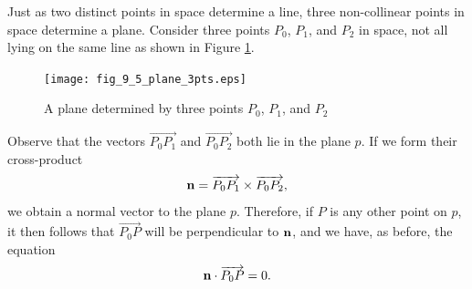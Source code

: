 Just as two distinct points in space determine a line, three
non-collinear points in space determine a plane.  
Consider three points $P_0$, $P_1$, and $P_2$ in space, not all lying
on the same line as shown in Figure \ref{F:9.5.Plane}.
\begin{figure}[ht]
\begin{center}
\texttt{[image: fig\_9\_5\_plane\_3pts.eps]}
\end{center}
\caption{A plane determined by three points $P_0$, $P_1$, and $P_2$}
\label{F:9.5.Plane}
\end{figure}

Observe that the vectors $\overrightarrow{P_0P_1}$ and
$\overrightarrow{P_0P_2}$ both lie in the plane $p$.  
If we form their cross-product
$$\mathbf{n} = \overrightarrow{P_0P_1} \times \overrightarrow{P_0P_2},$$
we obtain a normal vector to the plane $p$.  
Therefore, if $P$ is any other point on  $p$, it then follows that
$\overrightarrow{P_0P}$ will be perpendicular to $\mathbf{n}$, and we have,
as before, the equation
\begin{equation} \label{eq:9.5.plane_vect}
\mathbf{n} \cdot \overrightarrow{P_0P} = 0.
\end{equation}

%


